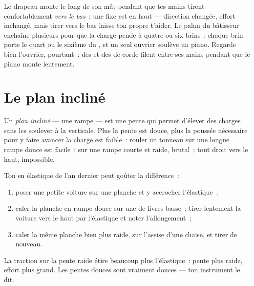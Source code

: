 \begin{example}\label{ex:g5:simple-machines:pulleywork}
Le drapeau monte le long de son mât pendant que tes mains tirent
confortablement \emph{vers le bas}~: une  fixe est en haut ---
direction changée, effort inchangé, mais tirer vers le bas laisse ton
propre  t'aider. Le palan du bâtisseur enchaîne plusieurs
 pour que la charge pende à quatre ou six brins~: chaque brin
porte le quart ou le sixième du , et un seul ouvrier soulève un
piano. Regarde bien l'ouvrier, pourtant~: des  et des  de
corde filent entre ses mains pendant que le piano monte lentement.
\end{example}

\section{Le plan incliné}

\begin{definition}\label{def:g5:simple-machines:ramp}
Un \emph{plan incliné} --- une rampe --- est une
pente qui permet d'élever des charges sans les soulever à la
verticale. Plus la pente est douce, plus la poussée nécessaire pour y
faire avancer la charge est faible~: rouler un tonneau sur une longue
rampe douce est facile~; sur une rampe courte et raide, brutal~; tout
droit vers le haut, impossible.
\end{definition}

\begin{method}\label{met:g5:simple-machines:measure}
Ton  en élastique de l'an dernier peut goûter la
différence~:
\begin{enumerate}
  \item poser une petite voiture sur une planche et y accrocher
        l'élastique~;
  \item caler la planche en rampe douce sur une  de livres
        basse~; tirer lentement la voiture vers le haut par
        l'élastique et noter l'allongement~;
  \item caler la même planche bien plus raide, sur l'assise d'une
        chaise, et tirer de nouveau.
\end{enumerate}
La traction sur la pente raide étire beaucoup plus l'élastique~:
pente plus raide, effort plus grand. Les pentes douces sont vraiment
douces --- ton instrument le dit.
\end{method}

